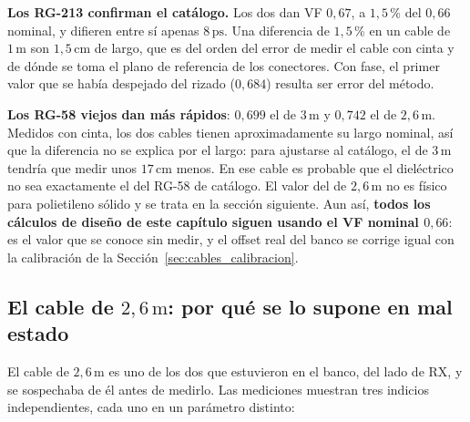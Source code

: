 \documentclass[12pt, a4paper, twoside]{report}
\begin{document}
\textbf{Los RG-213 confirman el catálogo.} Los dos dan VF $0{,}67$, a
$1{,}5$\,\% del $0{,}66$ nominal, y difieren entre sí apenas
$8\,\text{ps}$. Una diferencia de $1{,}5$\,\% en un cable de
$1\,\text{m}$ son $1{,}5\,\text{cm}$ de largo, que es del orden del
error de medir el cable con cinta y de dónde se toma el plano de
referencia de los conectores. Con fase, el primer valor que se había
despejado del rizado ($0{,}684$) resulta ser error del método.

\textbf{Los RG-58 viejos dan más rápidos}: $0{,}699$ el de
$3\,\text{m}$ y $0{,}742$ el de $2{,}6\,\text{m}$. Medidos con cinta,
los dos cables tienen aproximadamente su largo nominal, así que la
diferencia no se explica por el largo: para ajustarse al catálogo, el
de $3\,\text{m}$ tendría que medir unos $17\,\text{cm}$ menos. En ese
cable es probable que el dieléctrico no sea exactamente el del RG-58
de catálogo. El
valor del de $2{,}6\,\text{m}$ no es físico para polietileno sólido y
se trata en la sección siguiente. Aun así, \textbf{todos los cálculos
de diseño de este capítulo siguen usando el VF nominal $0{,}66$}: es
el valor que se conoce sin medir, y el offset real del banco se corrige
igual con la calibración de la Sección~\ref{sec:cables_calibracion}.

\subsection{El cable de $2{,}6\,\text{m}$: por qué se lo supone en mal estado}
\label{sub:cables_defectuoso}

El cable de $2{,}6\,\text{m}$ es uno de los dos que estuvieron en el
banco, del lado de RX, y se sospechaba de él antes de medirlo. Las
mediciones muestran tres indicios independientes, cada uno en un
parámetro distinto:
\end{document}
